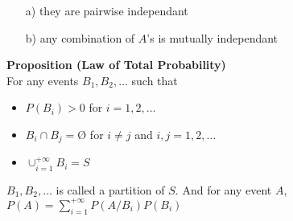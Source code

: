 \documentclass[12pt,a4paper,draft]{report}
\begin{document}
\begin{itemize}
\item[a)] they are pairwise independant
\item[b)] any combination of $A$'s is mutually independant
\end{itemize}
\textbf{Proposition (Law of Total Probability)}\\
For any events $B_1,B_2,\hdots$ such that 
\begin{itemize}
\item $P(B_i)>0$ for $i=1,2,\hdots$
\item $B_i\cap B_j=Ø$ for $i\neq j$ and $i,j=1,2,\hdots$
\item $\cup_{i=1}^{+\infty}B_i=S$
\end{itemize}
$B_1,B_2,\hdots$ is called a partition of $S$. And for any event $A$, $P(A)=\sum_{i=1}^{+\infty}P(A/B_i)P(B_i)$
\end{document}
